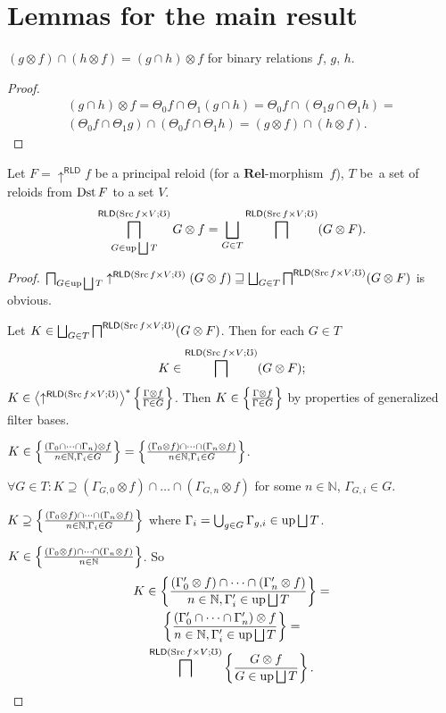 \section{Lemmas for the main result}
\begin{lem}
$(g\otimes f)\cap(h\otimes f)=(g\cap h)\otimes f$ for binary relations
$f$, $g$, $h$.\end{lem}
\begin{proof}
~
\begin{multline*}
(g\cap h)\otimes f=\Theta_{0}f\cap\Theta_{1}(g\cap h)=\Theta_{0}f\cap(\Theta_{1}g\cap\Theta_{1}h)=\\
(\Theta_{0}f\cap\Theta_{1}g)\cap(\Theta_{0}f\cap\Theta_{1}h)=(g\otimes f)\cap(h\otimes f).
\end{multline*}
\end{proof}
\begin{lem}
Let $F=\uparrow^{\mathsf{RLD}}f$ be a principal reloid (for a $\mathbf{Rel}$-morphism~$f$),
$T$ be~a set of reloids from $\operatorname{Dst} F$ to a set $V$.
\[
\bigsqcap_{G\in\operatorname{up}\bigsqcup T}^{\mathsf{RLD}(\operatorname{Src} f\times V;\mho)}G\otimes f=\bigsqcup_{G\in T}\bigsqcap^{\mathsf{RLD}(\operatorname{Src} f\times V;\mho)}(G\otimes F).
\]
\end{lem}
\begin{proof}
$\bigsqcap_{G\in\operatorname{up}\bigsqcup T}\uparrow^{\mathsf{RLD}(\operatorname{Src} f\times V;\mho)}(G\otimes f)\sqsupseteq\bigsqcup_{G\in T}\bigsqcap^{\mathsf{RLD}(\operatorname{Src} f\times V;\mho)}(G\otimes F)$
is obvious.

Let $K\in\bigsqcup_{G\in T}\bigsqcap^{\mathsf{RLD}(\operatorname{Src} f\times V;\mho)}(G\otimes F)$.
Then for each $G\in T$
\[
K\in\bigsqcap^{\mathsf{RLD}(\operatorname{Src} f\times V;\mho)}(G\otimes F);
\]
$K\in\left\langle \uparrow^{\mathsf{RLD}(\operatorname{Src} f\times V;\mho)}\right\rangle ^{\ast}\left\{ \frac{\Gamma\otimes f}{\Gamma\in G}\right\}$.
Then $K\in\left\{ \frac{\Gamma\otimes f}{\Gamma\in G}\right\}$ by properties of
generalized filter bases.

$K\in\left\{ \frac{(\Gamma_{0}\cap\dots\cap\Gamma_{n})\otimes f}{n\in\mathbb{N},\Gamma_{i}\in G}\right\}=\left\{ \frac{(\Gamma_{0}\otimes f)\cap\dots\cap(\Gamma_{n}\otimes f)}{n\in\mathbb{N},\Gamma_{i}\in G}\right\}$.

$\forall G\in T:K\supseteq(\Gamma_{G,0}\otimes f)\cap\dots\cap(\Gamma_{G,n}\otimes f)$
for some $n\in\mathbb{N}$, $\Gamma_{G,i}\in G$.

$K\supseteq\left\{ \frac{(\Gamma_{0}\otimes f)\cap\dots\cap(\Gamma_{n}\otimes f)}{n\in\mathbb{N},\Gamma_{i}\in G}\right\}$
where $\Gamma_{i}=\bigcup_{g\in G}\Gamma_{g,i}\in\operatorname{up}\bigsqcup T$.

$K\in\left\{ \frac{(\Gamma_{0}\otimes f)\cap\dots\cap(\Gamma_{n}\otimes f)}{n\in\mathbb{N}}\right\}$.
So
\begin{multline*}
K\in\left\{ \frac{(\Gamma'_{0}\otimes f)\cap\dots\cap(\Gamma'_{n}\otimes f)}{n\in\mathbb{N},\Gamma'_{i}\in\operatorname{up}\bigsqcup T}\right\}=\\
\left\{ \frac{(\Gamma'_{0}\cap\dots\cap\Gamma'_{n})\otimes f}{n\in\mathbb{N},\Gamma'_{i}\in\operatorname{up}\bigsqcup T}\right\}=\\
\bigsqcap^{\mathsf{RLD}(\operatorname{Src} f\times V;\mho)}\left\{ \frac{G\otimes f}{G\in\operatorname{up}\bigsqcup T}\right\}.
\end{multline*}

\end{proof}

